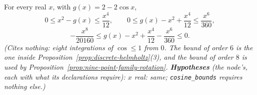 \begin{lemma}
\label{lem:cosine-bounds}
\leanok
For every real $x$, with $g(x) = 2 - 2\cos x$,
\[
  0 \le x^2 - g(x) \le \frac{x^4}{12}, \qquad
  0 \le g(x) - x^2 + \frac{x^4}{12} \le \frac{x^6}{360},
\]
\[
  -\frac{x^8}{20160} \le g(x) - x^2 + \frac{x^4}{12} - \frac{x^6}{360} \le 0 .
\]
\statusT\quad\emph{(Cites nothing: eight integrations of $\cos \le 1$ from $0$. The bound of order
$6$ is the one inside Proposition~\ref{prop:discrete-helmholtz}(3), and the bound of order $8$ is
used by Proposition~\ref{prop:nine-point-family-rotation}. \textbf{Hypotheses} (the node's, each
with what its declarations require): $x$ real: same; \texttt{cosine\_bounds} requires nothing else.)}
\end{lemma}

